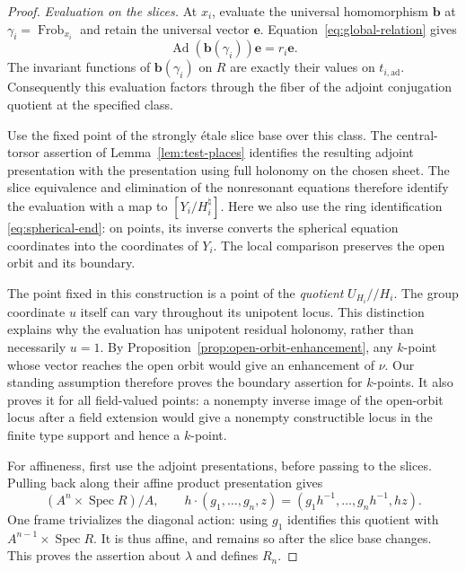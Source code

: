 \documentclass[11pt]{article}
\numberwithin{equation}{section}
\theoremstyle{definition}
\theoremstyle{remark}
\newcommand{\Frob}{\operatorname{Frob}}
\newcommand{\Ad}{\operatorname{Ad}}
\newcommand{\Spec}{\operatorname{Spec}}
\begin{document}
\begin{proof}
\emph{Evaluation on the slices.}
At $x_i$, evaluate the universal homomorphism $\mathbf b$ at
$\gamma_i=\Frob_{x_i}$ and retain the universal vector $\mathbf e$.
Equation~\eqref{eq:global-relation} gives
\[
 \Ad(\mathbf b(\gamma_i))\mathbf e=r_i\mathbf e.
\]
The invariant functions of $\mathbf b(\gamma_i)$ on $R$ are exactly their
values on $t_{i,\mathrm{ad}}$.  Consequently this evaluation factors
through the fiber of the adjoint conjugation quotient at the specified
class.

Use the fixed point of the strongly \'etale slice base over this class.
The central-torsor assertion of Lemma~\ref{lem:test-places} identifies
the resulting adjoint presentation with the presentation using full
holonomy on the chosen sheet.  The slice equivalence and elimination of
the nonresonant equations therefore identify the evaluation with a map
to $[Y_i/H_i^\natural]$.  Here we also use the ring identification
\eqref{eq:spherical-end}: on points, its inverse converts the spherical
equation coordinates into the coordinates of $Y_i$.  The local comparison
preserves the open orbit and its boundary.

The point fixed in this construction is a point of the \emph{quotient}
$U_{H_i}/\!/H_i$.  The group coordinate $u$ itself can vary throughout
its unipotent locus.  This distinction explains why the evaluation has
unipotent residual holonomy, rather than necessarily $u=1$.  By
Proposition~\ref{prop:open-orbit-enhancement}, any $k$-point whose vector
reaches the open orbit would give an enhancement of $\nu$.  Our standing
assumption therefore proves the boundary assertion for $k$-points.  It
also proves it for all field-valued points: a nonempty inverse image of
the open-orbit locus after a field extension would give a nonempty
constructible locus in the finite type support and hence a $k$-point.

For affineness, first use the adjoint presentations, before passing to
the slices.  Pulling back along their affine product presentation gives
\begin{equation}\label{boundary:framed-affine}
 (A^n\times\Spec R)/A,
 \qquad
 h\cdot(g_1,\ldots,g_n,z)
       =(g_1h^{-1},\ldots,g_nh^{-1},hz).
\end{equation}
One frame trivializes the diagonal action: using $g_1$ identifies this
quotient with $A^{n-1}\times\Spec R$.  It is thus affine, and remains so
after the slice base changes.  This proves the assertion about $\lambda$
and defines $R_n$.


\end{proof}
\end{document}

